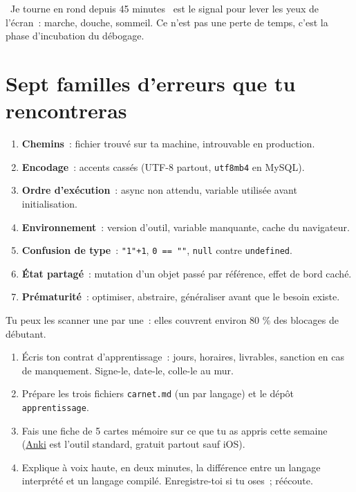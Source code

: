 \documentclass[12pt,a4paper,twoside,openright]{book}
\newcommand{\fichier}[1]{\texttt{\color{pathgreen}#1}}
\newcommand{\link}[2]{\href{#2}{#1}}
\begin{document}
\begin{note}
\og ~Je tourne en rond depuis 45 minutes~ \fg{} est le signal pour lever les yeux de l'\'ecran~: marche,
douche, sommeil. Ce n'est pas une perte de temps, c'est la phase d'incubation du d\'ebogage.
\end{note}

\section{Sept familles d'erreurs que tu rencontreras}

\begin{enumerate}
  \item \textbf{Chemins}~: fichier trouv\'e sur ta machine, introuvable en production.
  \item \textbf{Encodage}~: accents cass\'es (UTF-8 partout, \verb|utf8mb4| en MySQL).
  \item \textbf{Ordre d'ex\'ecution}~: async non attendu, variable utilis\'ee avant initialisation.
  \item \textbf{Environnement}~: version d'outil, variable manquante, cache du navigateur.
  \item \textbf{Confusion de type}~: \verb|"1"+1|, \verb|0 == ""|, \verb|null| contre \verb|undefined|.
  \item \textbf{\'Etat partag\'e}~: mutation d'un objet pass\'e par r\'ef\'erence, effet de bord cach\'e.
  \item \textbf{Pr\'ematurit\'e}~: optimiser, abstraire, g\'en\'eraliser avant que le besoin existe.
\end{enumerate}

Tu peux les scanner une par une~: elles couvrent environ 80 \% des blocages de d\'ebutant.

\begin{exercice}
\begin{enumerate}
  \item \'Ecris ton contrat d'apprentissage~: jours, horaires, livrables, sanction en cas de
        manquement. Signe-le, date-le, colle-le au mur.
  \item Pr\'epare les trois fichiers \fichier{carnet.md} (un par langage) et le d\'ep\^ot
        \verb|apprentissage|.
  \item Fais une fiche de 5 cartes m\'emoire sur ce que tu as appris cette semaine
        (\link{Anki}{https://apps.ankiweb.net/} est l'outil standard, gratuit partout sauf iOS).
  \item Explique \`a voix haute, en deux minutes, la diff\'erence entre un langage interpr\'et\'e
        et un langage compil\'e. Enregistre-toi si tu oses~; r\'e\'ecoute.
\end{enumerate}
\end{exercice}
\end{document}

